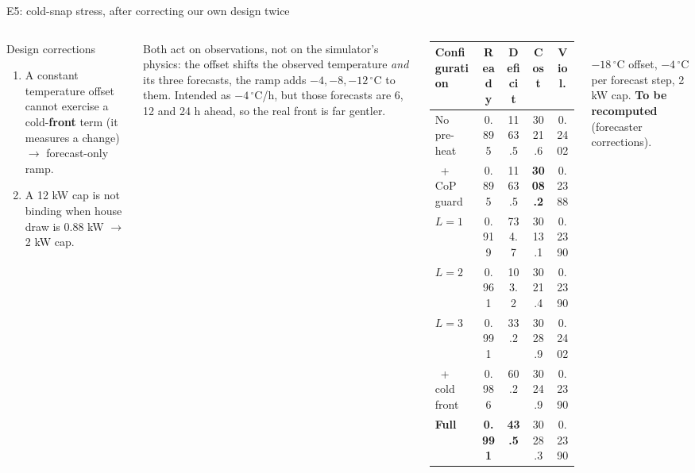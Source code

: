 \documentclass[aspectratio=169,10pt]{beamer}
\begin{document}
\begin{frame}{E5: cold-snap stress, after correcting our own design twice}
\begin{columns}[T]
\begin{alertblock}{Design corrections}
\begin{enumerate}
  \item A constant temperature offset cannot exercise a cold-\textbf{front} term (it measures a change) $\rightarrow$ forecast-only ramp.
  \item A 12 kW cap is not binding when house draw is 0.88 kW $\rightarrow$ 2 kW cap.
\end{enumerate}
\end{alertblock}
\small Both act on observations, not on the simulator's physics: the offset shifts the observed temperature \emph{and} its three forecasts, the ramp adds $-4, -8, -12\,^\circ$C to them. Intended as $-4\,^\circ$C/h, but those forecasts are 6, 12 and 24 h ahead, so the real front is far gentler.
\scriptsize
\begin{tabular}{@{}lcccc@{}}
\toprule
Configuration & Ready & Deficit & Cost & Viol. \\
\midrule
No pre-heat & 0.895 & 1163.5 & 3021.6 & 0.2402 \\
\ + CoP guard & 0.895 & 1163.5 & \textbf{3008.2} & 0.2388 \\
$L = 1$ & 0.919 & 734.7 & 3013.1 & 0.2390 \\
$L = 2$ & 0.961 & 103.2 & 3021.4 & 0.2390 \\
$L = 3$ & 0.991 & 33.2 & 3028.9 & 0.2402 \\
\ + cold front & 0.986 & 60.2 & 3024.9 & 0.2390 \\
\textbf{Full} & \textbf{0.991} & \textbf{43.5} & 3028.3 & 0.2390 \\
\bottomrule
\end{tabular}\\[3pt]
$-18\,^\circ$C offset, $-4\,^\circ$C per forecast step, 2 kW cap. \textbf{To be recomputed} (forecaster corrections).
\end{columns}
\end{frame}
\end{document}
